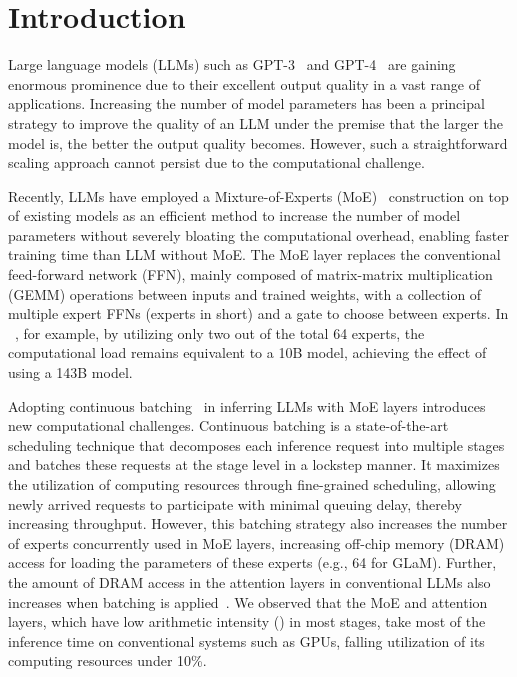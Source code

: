 \section{Introduction}
\label{sec:introduction}


Large language models (LLMs) such as GPT-3~\cite{neurips_2020_gpt-3} and GPT-4~\cite{gpt4-techreport} are gaining enormous prominence due to their excellent output quality in a vast range of applications.
Increasing the number of model parameters has been a principal strategy to improve the quality of an LLM under the premise that the larger the model is, the better the output quality becomes.
However, such a straightforward scaling approach cannot persist due to the computational challenge.

Recently, LLMs have employed a Mixture-of-Experts (MoE)~\cite{jmlr-2022-switchtransformer, emnlp-2022-metamoe, icml-2022-DSMoE} construction on top of existing models as an efficient method to increase the number of model parameters without severely bloating the computational overhead, enabling faster training time than LLM without MoE.
The MoE layer replaces the conventional feed-forward network (FFN), mainly composed of matrix-matrix multiplication (GEMM) operations between inputs and trained weights, with a collection of multiple expert FFNs (experts in short) and a gate to choose between experts.
In \glam~\cite{icml-2022-GLaM}, for example, by utilizing only two out of the total 64 experts, the computational load remains equivalent to a 10B model, achieving the effect of using a 143B model.


Adopting continuous batching~\cite{osdi-2022-orca} in inferring LLMs with MoE layers introduces new computational challenges.
Continuous batching is a state-of-the-art scheduling technique that decomposes each inference request into multiple stages and batches these requests at the stage level in a lockstep manner. 
It maximizes the utilization of computing resources through fine-grained scheduling, allowing newly arrived requests to participate with minimal queuing delay, thereby increasing throughput. 
However, this batching strategy also increases the number of experts concurrently used in MoE layers, increasing off-chip memory (DRAM) access for loading the parameters of these experts (e.g., 64 for GLaM).
Further, the amount of DRAM access in the attention layers in conventional LLMs also increases when batching is applied~\cite{asplos-2024-attacc}. 
We observed that the MoE and attention layers, which have low arithmetic intensity (\opb) in most stages, take most of the inference time on conventional systems such as GPUs, falling utilization of its computing resources under 10\%.

